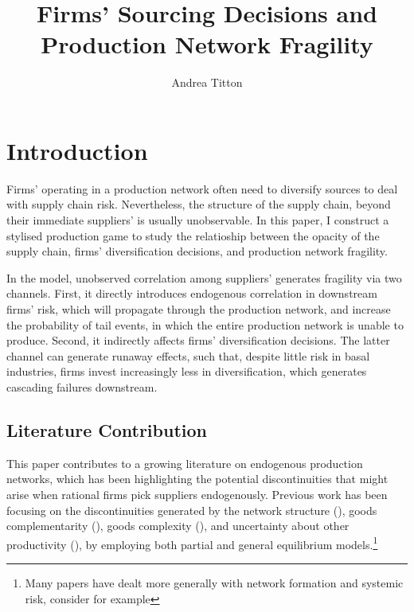 \documentclass[draft, american, abstract=on]{scrartcl}
\author{Andrea Titton}
\title{Firms' Sourcing Decisions and\\ Production Network Fragility}
\theoremstyle{plain}
\newcommand\notes[1]{\textcolor{teal}{\footnotesize \textbf{#1}}}
\begin{document}
\maketitle
\section{Introduction}

\iffalse
\notes{
  \begin{enumerate}
    \item Research question
    \item Contribution to the literature
    \item Why do we care?
  \end{enumerate}
}
\fi

Firms' operating in a production network often need to diversify sources to deal with supply chain risk. Nevertheless, the structure of the supply chain, beyond their immediate suppliers' is usually unobservable. In this paper, I construct a stylised production game to study the relatioship between the opacity of the supply chain, firms' diversification decisions, and production network fragility. 

In the model, unobserved correlation among suppliers' generates fragility via two channels. First, it directly introduces endogenous correlation in downstream firms' risk, which will propagate through the production network, and increase the probability of tail events, in which the entire production network is unable to produce. Second, it indirectly affects firms' diversification decisions. The latter channel can generate runaway effects, such that, despite little risk in basal industries, firms invest increasingly less in diversification, which generates cascading failures downstream.

\subsection{Literature Contribution}

This paper contributes to a growing literature on endogenous production networks, which has been highlighting the potential discontinuities that might arise when rational firms pick suppliers endogenously. Previous work has been focusing on the discontinuities generated by the network structure (\cite{baqaee_macroeconomic_2019}), goods complementarity (\cite{acemoglu_endogenous_2020}), goods complexity (\cite{elliott_supply_2022}), and uncertainty about other productivity (\cite{kopytov_endogenous_2021}), by employing both partial and general equilibrium models.\footnote{Many papers have dealt more generally with network formation and systemic risk, consider for example }
\end{document}
